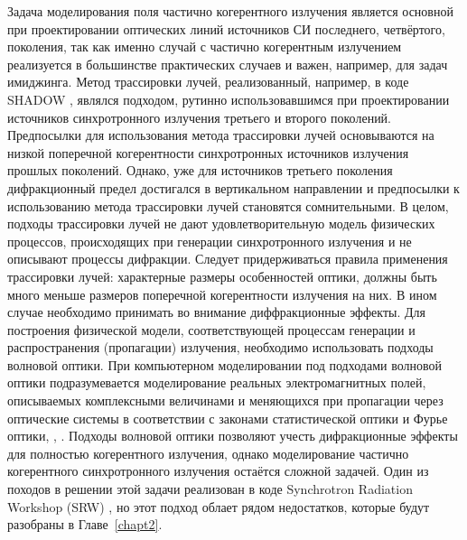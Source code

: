 Задача моделирования поля частично когерентного излучения является основной при проектировании оптических линий источников СИ последнего, четвёртого, поколения, так как именно случай с частично когерентным излучением реализуется в большинстве практических случаев и важен, например, для задач имиджинга. Метод трассировки лучей, реализованный, например, в коде SHADOW \cite{sanchez_del_rio_shadow3_2011}, являлся подходом, рутинно использовавшимся при проектировании источников синхротронного излучения третьего и второго поколений. Предпосылки для использования метода трассировки лучей основываются на низкой поперечной когерентности синхротронных источников излучения прошлых поколений. Однако, уже для источников третьего поколения дифракционный предел достигался в вертикальном направлении и предпосылки к использованию метода трассировки лучей становятся сомнительными. В целом, подходы трассировки лучей не дают удовлетворительную модель физических процессов, происходящих при генерации синхротронного излучения и не описывают процессы дифракции. Следует придерживаться правила применения трассировки лучей: характерные размеры особенностей оптики, должны быть много меньше размеров поперечной когерентности излучения на них. В ином случае необходимо принимать во внимание диффракционные эффекты.
Для построения физической модели, соответствующей процессам генерации и распространения (пропагации) излучения, необходимо использовать подходы волновой оптики. При компьютерном моделировании под подходами волновой оптики подразумевается моделирование реальных электромагнитных полей, описываемых комплексными величинами и меняющихся при пропагации через оптические системы в соответствии с законами статистической оптики и Фурье оптики, \cite{goodman_introduction_2005}, \cite{goodman_statistical_2015}. Подходы волновой оптики позволяют учесть дифракционные эффекты для полностью когерентного излучения, однако моделирование частично когерентного синхротронного излучения остаётся сложной задачей. Один из походов в решении этой задачи реализован в коде Synchrotron Radiation Workshop (SRW) \cite{chubar_accurate_1998}, но этот подход облает рядом недостатков, которые будут разобраны в Главе~\ref{chapt2}.

